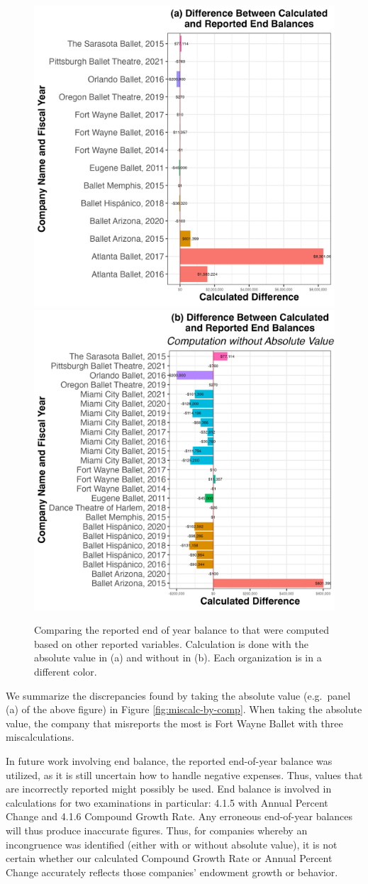 \documentclass[Dance Data
Project,article,submit,moreauthors,pdftex]{mdpi}
\begin{document}
\begin{figure}[H]
\includegraphics[width=0.5\linewidth,]{../images/diff_end_bal} \includegraphics[width=0.5\linewidth,]{../images/diff_end_bal_no_abs} \caption{\label{fig:miscalc}Comparing the reported end of year balance to that were computed based on other reported variables. Calculation is done with the absolute value in (a) and without in (b). Each organization is in a different color.}\label{fig:unnamed-chunk-5}
\end{figure}

We summarize the discrepancies found by taking the absolute value
(e.g.~panel (a) of the above figure) in Figure
\ref{fig:miscalc-by-comp}. When taking the absolute value, the company
that misreports the most is Fort Wayne Ballet with three
miscalculations.

In future work involving end balance, the reported end-of-year balance
was utilized, as it is still uncertain how to handle negative expenses.
Thus, values that are incorrectly reported might possibly be used. End
balance is involved in calculations for two examinations in particular:
4.1.5 with Annual Percent Change and 4.1.6 Compound Growth Rate. Any
erroneous end-of-year balances will thus produce inaccurate figures.
Thus, for companies whereby an incongruence was identified (either with
or without absolute value), it is not certain whether our calculated
Compound Growth Rate or Annual Percent Change accurately reflects those
companies' endowment growth or behavior.
\end{document}
